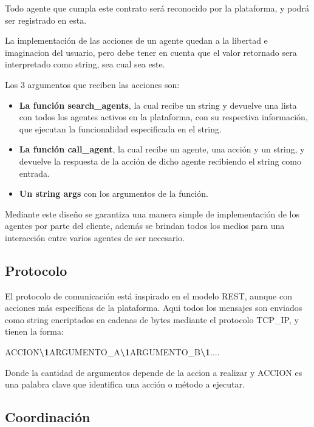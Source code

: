 \documentclass[11pt]{article}
\begin{document}
    Todo agente que cumpla este contrato será reconocido por la plataforma, y podrá ser registrado en esta.

    La implementación de las acciones de un agente quedan a la libertad e imaginacion del usuario, pero debe 
    tener en cuenta que el valor retornado sera interpretado como string, sea cual sea este.

    Los 3 argumentos que reciben las acciones son:
    \begin{itemize}
        \item \textbf{La función search\_agents}, la cual recibe un string y devuelve una lista con todos los agentes activos en la plataforma, con su 
        respectiva información, que ejecutan la funcionalidad especificada en el string.
        \item \textbf{La función call\_agent}, la cual recibe un agente, una acción y un string, y devuelve la respuesta de la acción de dicho agente recibiendo 
        el string como entrada.
        \item \textbf{Un string args} con los argumentos de la función.
    \end{itemize}

    Mediante este diseño se garantiza una manera simple de implementación de los agentes por parte del cliente, además se brindan todos los medios para una 
    interacción entre varios agentes de ser necesario.

    \newpage

    \subsection{Protocolo}
    El protocolo de comunicación está inspirado en el modelo REST, aunque con acciones más específicas de 
    la plataforma. Aqui todos los mensajes son enviados como string encriptados en cadenas de bytes mediante 
    el protocolo TCP\_IP, y tienen la forma:

    \begin{center}
        ACCION\textbf{\textbackslash1}ARGUMENTO\_A\textbf{\textbackslash1}ARGUMENTO\_B\textbf{\textbackslash1}....
    \end{center}

    Donde la cantidad de argumentos depende de la accion a realizar y ACCION es una palabra clave que identifica 
    una acción o método a ejecutar.

    \subsection{Coordinación}
\end{document}
